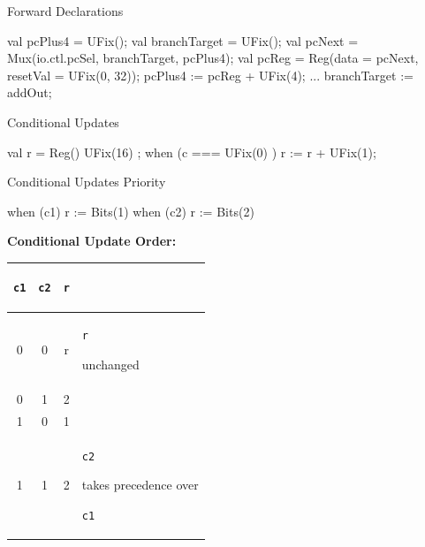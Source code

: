 \documentclass[xcolor=pdflatex,dvipsnames,table]{beamer}
\newcommand{\kode}[1]{\begin{footnotesize}{\tt #1}\end{footnotesize}}
\begin{document}
\begin{frame}[fragile]{Forward Declarations}

\begin{scala}
val pcPlus4      = UFix(); 
val branchTarget = UFix();
val pcNext       = Mux(io.ctl.pcSel, branchTarget, pcPlus4);
val pcReg        = Reg(data = pcNext, resetVal = UFix(0, 32)); 
pcPlus4         := pcReg + UFix(4); 
... 
branchTarget    := addOut;
\end{scala}

\end{frame}

\begin{frame}[fragile]{Conditional Updates}

\begin{scala}
val r = Reg() { UFix(16) };
when (c === UFix(0) ) {
  r := r + UFix(1);
}
\end{scala}

\end{frame}

\begin{frame}[fragile]{Conditional Updates Priority}

\begin{scala}
when (c1)   { r := Bits(1) }
when (c2)   { r := Bits(2) }
\end{scala}

\textbf{Conditional Update Order:}

\begin{center}
\begin{tabular}{|c|c|c|l|}
\hline
\kode{c1} & \kode{c2}  &  \kode{r} & \\
\hline
0 &  0 & r &  \kode{r} unchanged \\
0 &  1 & 2 & \\
1 &  0 & 1 & \\
1 &  1 & 2& \kode{c2} takes precedence over \kode{c1} \\
\hline
\end{tabular}
\end{center}

\end{frame}
\end{document}
